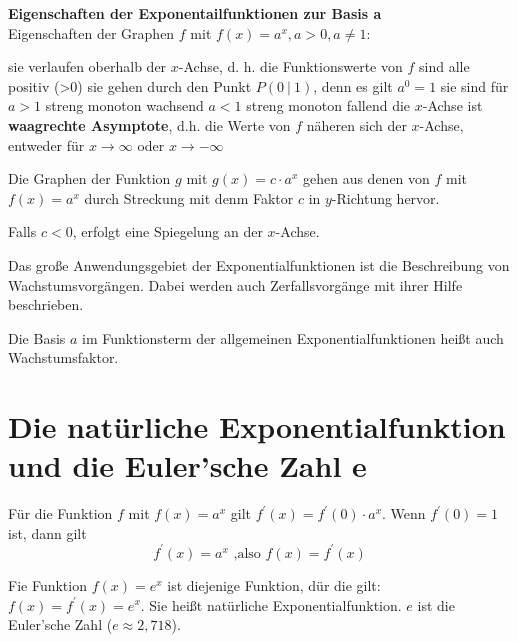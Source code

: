 \textbf{Eigenschaften der Exponentailfunktionen zur Basis a}\\
Eigenschaften der Graphen $f$ mit $f(x) = a^x, a>0, a\neq1$:
\begin{outline}
    \1 sie verlaufen oberhalb der $x$-Achse, d. h. die Funktionswerte von $f$ sind alle positiv (>0) 
    \1 sie gehen durch den Punkt $P(0 \ | \ 1)$, denn es gilt $a^0 = 1$
    \1 sie sind für
    \2 $a>1$ streng monoton wachsend
    \2 $a<1$ streng monoton fallend
    \1 die $x$-Achse ist \textbf{waagrechte Asymptote}, d.h. die Werte von $f$ näheren sich der $x$-Achse, entweder für $x \to \infty$ oder $x \to -\infty$
\end{outline}
Die Graphen der Funktion $g$ mit $g(x) = c\cdot a^x$ gehen aus denen von $f$ mit $f(x)=a^x$ durch Streckung mit denm Faktor $c$ in $y$-Richtung hervor.

Falls $c<0$, erfolgt eine Spiegelung an der $x$-Achse.

Das große Anwendungsgebiet der Exponentialfunktionen ist die Beschreibung von Wachstumsvorgängen. Dabei werden auch Zerfallsvorgänge mit ihrer Hilfe beschrieben.

Die Basis $a$ im Funktionsterm der allgemeinen Exponentialfunktionen heißt auch Wachstumsfaktor.

\section{Die natürliche Exponentialfunktion und die Euler'sche Zahl e}

\begin{satz}
    Für die Funktion $f$ mit $f(x) = a^x$ gilt $f^\prime(x) = f^\prime(0) \cdot a^x$. Wenn $f^\prime(0) = 1$ ist, dann gilt $$f^\prime(x) = a^x \text{ ,also } f(x) = f^\prime(x)$$
\end{satz}

\begin{satz}
    Fie Funktion $f(x) = e^x$ ist diejenige Funktion, dür die gilt: $f(x) = f^\prime(x) = e^x$. Sie heißt natürliche Exponentialfunktion. $e$ ist die Euler'sche Zahl ($e \approx 2,718$).
\end{satz}

\ \\
\ \\

